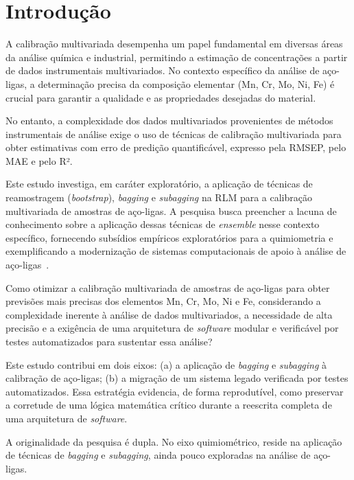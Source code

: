 \chapter{Introdução}
\label{cha:introducao}

A calibração multivariada desempenha um papel fundamental em diversas áreas
da análise química e industrial, permitindo a estimação de concentrações a
partir de dados instrumentais multivariados. No contexto específico da análise
de aço-ligas, a determinação precisa da composição elementar (Mn, Cr, Mo, Ni,
Fe) é crucial para garantir a qualidade e as propriedades desejadas do
material.

No entanto, a complexidade dos dados multivariados provenientes de métodos
instrumentais de análise exige o uso de técnicas de calibração multivariada
para obter estimativas com erro de predição quantificável, expresso pela
\gls{RMSEP}, pelo \gls{MAE} e pelo \gls{R²}.

Este estudo investiga, em caráter exploratório, a aplicação de técnicas de reamostragem (\textit{bootstrap}), \textit{bagging} e \textit{subagging} na \gls{RLM} para a calibração multivariada de amostras de aço-ligas. A pesquisa busca preencher a lacuna de conhecimento sobre a aplicação dessas técnicas de \textit{ensemble} nesse contexto específico, fornecendo subsídios empíricos exploratórios para a quimiometria e exemplificando a modernização de sistemas computacionais de apoio à análise de aço-ligas~\cite{SKOOG:1997,HARDLE:2007,TIMM:2002}.

Como otimizar a calibração multivariada de amostras de aço-ligas para obter previsões mais precisas dos elementos Mn, Cr, Mo, Ni e Fe, considerando a complexidade inerente à análise de dados multivariados, a necessidade de alta precisão e a exigência de uma arquitetura de \textit{software} modular e verificável por testes automatizados para sustentar essa análise?

Este estudo contribui em dois eixos: (a) a aplicação de \textit{bagging} e \textit{subagging} à calibração de aço-ligas; (b) a migração de um sistema legado verificada por testes automatizados. Essa estratégia evidencia, de forma reprodutível, como preservar a corretude de uma lógica matemática crítico durante a reescrita completa de uma arquitetura de \textit{software}.

A originalidade da pesquisa é dupla. No eixo quimiométrico, reside na aplicação de técnicas de \textit{bagging} e \textit{subagging}, ainda pouco exploradas na análise de aço-ligas.

